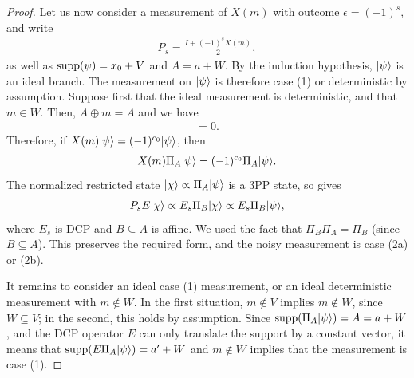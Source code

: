 \begin{proof}
    Let us now consider a measurement of $X(m)$ with outcome
    $\epsilon=(-1)^s$, and write
    \begin{align}
        P_s=\frac{I+(-1)^sX(m)}{2},
    \end{align}
    as well as $\operatorname{supp}(\psi)=x_0+V$ and $A=a+W$.
    By the induction hypothesis, $|\psi\rangle$ is an ideal branch.
    The measurement on $|\psi\rangle$ is therefore case (1) or deterministic by assumption.
    Suppose first that the ideal measurement is deterministic, and that
    $m\in W$. Then, $A\oplus m=A$ and we have
    \begin{align}
        [X(m),\Pi_A]=0.
    \end{align}
    Therefore, if $X(m)|\psi\rangle=(-1)^{c_0}|\psi\rangle$, then
    \begin{align}
        X(m)\Pi_A|\psi\rangle
        =(-1)^{c_0}\Pi_A|\psi\rangle.
    \end{align}
    The normalized restricted state
    $|\chi\rangle\propto\Pi_A|\psi\rangle$ is a 3PP state, so
     gives
    \begin{align}
        P_sE|\chi\rangle
        \propto E_s\Pi_B|\chi\rangle
        \propto E_s\Pi_B|\psi\rangle,
    \end{align}
    where $E_s$ is DCP and $B\subseteq A$ is affine. We used the fact that $\Pi_B \Pi_A=\Pi_B$ (since $B\subseteq A$). This preserves the required form, and the noisy measurement is case (2a) or (2b).

    It remains to consider an ideal case (1) measurement, or an ideal deterministic measurement with $m\notin W$.
    In the first situation, $m\notin V$ implies $m\notin W$, since $W\subseteq V$; in the second, this holds by assumption. Since $\operatorname{supp}(\Pi_A |\psi\rangle)=A=a+W$, and the DCP operator $E$ can only translate the support by a constant vector, it means that $\operatorname{supp}(E \Pi_A |\psi\rangle)=a'+W$ and $m \notin W$ implies that the measurement is case (1).


\end{proof}
